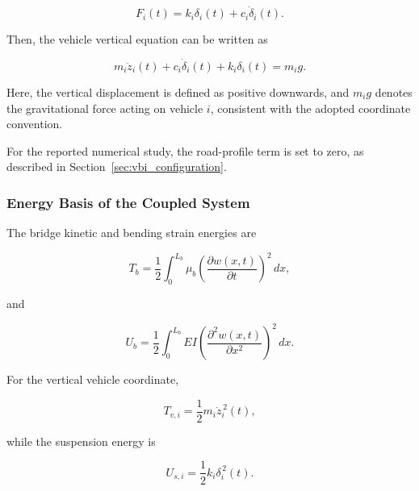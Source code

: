 \documentclass[journal]{IEEEtran}
\begin{document}
\begin{equation}
F_i(t)
=
k_i \delta_i(t)
+
c_i \dot{\delta}_i(t).
\end{equation}

Then, the vehicle vertical equation can be written as


\begin{equation}
m_i\ddot{z}_i(t)
+
c_i\dot{\delta}_i(t)
+
k_i\delta_i(t)
=
m_i g.
\label{eq:vehicle_motion_gravity}
\end{equation}

Here, the vertical displacement is defined as positive
downwards, and $m_i g$ denotes the gravitational
force acting on vehicle $i$, consistent with the adopted
coordinate convention.



For the reported numerical study, the road-profile term is set to zero,
as described in Section~\ref{sec:vbi_configuration}.


\subsubsection{Energy Basis of the Coupled System}

The bridge kinetic and bending strain energies are

\begin{equation}
T_b
=
\frac{1}{2}
\int_{0}^{L_b}\mu_b
\left(
\frac{\partial w(x,t)}{\partial t}
\right)^2
\,dx,
\end{equation}

and

\begin{equation}
U_b
=
\frac{1}{2}
\int_{0}^{L_b}
EI
\left(
\frac{\partial^2 w(x,t)}{\partial x^2}
\right)^2
\,dx.
\end{equation}

For the vertical vehicle coordinate,

\begin{equation}
T_{v,i}
=
\frac{1}{2}
m_i
\dot{z}_i^{\,2}(t),
\end{equation}

while the suspension energy is

\begin{equation}
U_{s,i}
=
\frac{1}{2}
k_i
\delta_i^{\,2}(t).
\end{equation}
\end{document}
